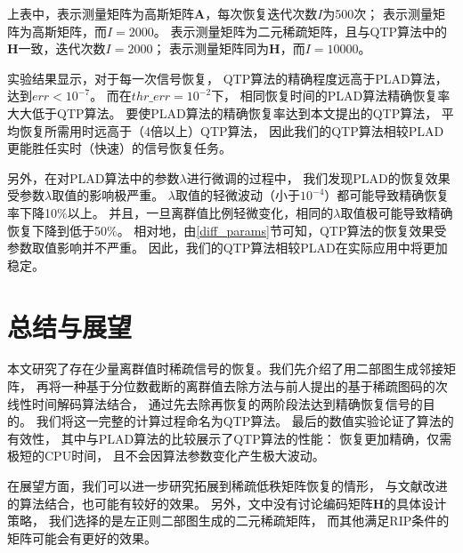 \documentclass[AutoFakeBold]{LZUThesis}
\begin{document}
上表中，表示测量矩阵为高斯矩阵$\mathbf{A}$，每次恢复迭代次数$I$为500次；
表示测量矩阵为高斯矩阵，而$I = 2000$。
表示测量矩阵为二元稀疏矩阵，且与QTP算法中的$\mathbf{H}$一致，迭代次数$I=2000$；
表示测量矩阵同为$\mathbf{H}$，而$I=10000$。

实验结果显示，对于每一次信号恢复，
QTP算法的精确程度远高于PLAD算法，达到$err < 10^{-7}$。
而在$thr\_err = 10^{-2}$下，
相同恢复时间的PLAD算法精确恢复率大大低于QTP算法。
要使PLAD算法的精确恢复率达到本文提出的QTP算法，
平均恢复所需用时远高于（4倍以上）QTP算法，
因此我们的QTP算法相较PLAD更能胜任实时（快速）的信号恢复任务。

另外，在对PLAD算法中的参数$\lambda$进行微调的过程中，
我们发现PLAD的恢复效果受参数$\lambda$取值的影响极严重。
$\lambda$取值的轻微波动（小于$10^{-4}$）都可能导致精确恢复率下降10\%以上。
并且，一旦离群值比例轻微变化，相同的$\lambda$取值极可能导致精确恢复下降到低于50\%。
相对地，由\ref{diff_params}节可知，QTP算法的恢复效果受参数取值影响并不严重。
因此，我们的QTP算法相较PLAD在实际应用中将更加稳定。

\chapter{总结与展望}
\label{5}

本文研究了存在少量离群值时稀疏信号的恢复。我们先介绍了用二部图生成邻接矩阵，
再将一种基于分位数截断的离群值去除方法与前人提出的基于稀疏图码的次线性时间解码算法结合，
通过先去除再恢复的两阶段法达到精确恢复信号的目的。
我们将这一完整的计算过程命名为QTP算法。
最后的数值实验论证了算法的有效性，
其中与PLAD算法的比较展示了QTP算法的性能：
恢复更加精确，仅需极短的CPU时间，
且不会因算法参数变化产生极大波动。

在展望方面，我们可以进一步研究拓展到稀疏低秩矩阵恢复的情形，
与文献\cite{10120641}改进的算法结合，也可能有较好的效果。
另外，文中没有讨论编码矩阵$\mathbf{H}$的具体设计策略，
我们选择的是左正则二部图生成的二元稀疏矩阵，
而其他满足RIP条件的矩阵可能会有更好的效果。


% 


\backmatter


\printbib
\end{document}
